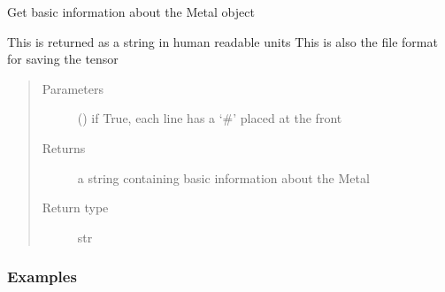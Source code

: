 \documentclass[a4paper,10pt,english,openany,oneside]{sphinxmanual}
\begin{document}
\begin{fulllineitems}
\begin{fulllineitems}
\begin{fulllineitems}
\label{\detokenize{reference/generated/paramagpy.metal.Metal.info:paramagpy.metal.Metal.info}}
Get basic information about the Metal object

This is returned as a string in human readable units
This is also the file format for saving the tensor
\begin{quote}\begin{description}
\item[{Parameters}] \leavevmode
{} (\sphinxstyleliteralemphasis{\sphinxupquote{ (}}\sphinxstyleliteralemphasis{\sphinxupquote{)}}) \textendash{} if True, each line has a ‘\#’ placed at the front

\item[{Returns}] \leavevmode
{} \textendash{} a string containing basic information about the Metal

\item[{Return type}] \leavevmode
str

\end{description}\end{quote}
\subsubsection*{Examples}

%
\begin{sphinxVerbatim}[commandchars=\\\{\}]
  
\end{sphinxVerbatim}


\end{fulllineitems}
\end{fulllineitems}
\end{fulllineitems}
\end{document}
